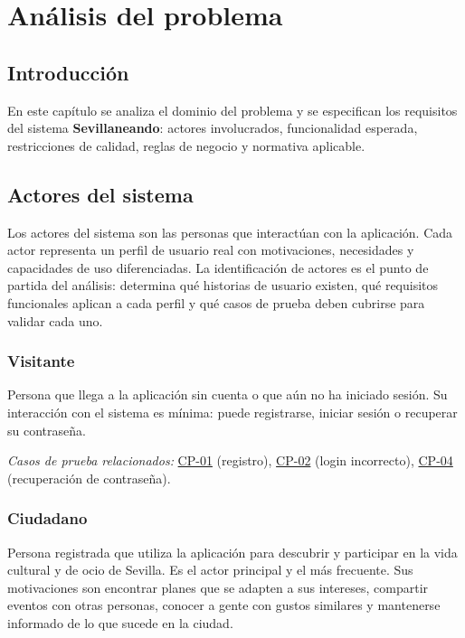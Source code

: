 \chapter{Análisis del problema}\label{cap:analisis}

\section{Introducción}

En este capítulo se analiza el dominio del problema y se especifican los requisitos del sistema \textbf{Sevillaneando}: actores involucrados, funcionalidad esperada, restricciones de calidad, reglas de negocio y normativa aplicable.

\section{Actores del sistema}

Los actores del sistema son las personas que interactúan con la aplicación. Cada actor representa un perfil de usuario real con motivaciones, necesidades y capacidades de uso diferenciadas. La identificación de actores es el punto de partida del análisis: determina qué historias de usuario existen, qué requisitos funcionales aplican a cada perfil y qué casos de prueba deben cubrirse para validar cada uno.

\subsection{Visitante}

Persona que llega a la aplicación sin cuenta o que aún no ha iniciado sesión. Su interacción con el sistema es mínima: puede registrarse, iniciar sesión o recuperar su contraseña.

\textit{Casos de prueba relacionados:} \hyperref[cp:01]{CP-01} (registro), \hyperref[cp:02]{CP-02} (login incorrecto), \hyperref[cp:04]{CP-04} (recuperación de contraseña).

\subsection{Ciudadano}

Persona registrada que utiliza la aplicación para descubrir y participar en la vida cultural y de ocio de Sevilla. Es el actor principal y el más frecuente. Sus motivaciones son encontrar planes que se adapten a sus intereses, compartir eventos con otras personas, conocer a gente con gustos similares y mantenerse informado de lo que sucede en la ciudad.

